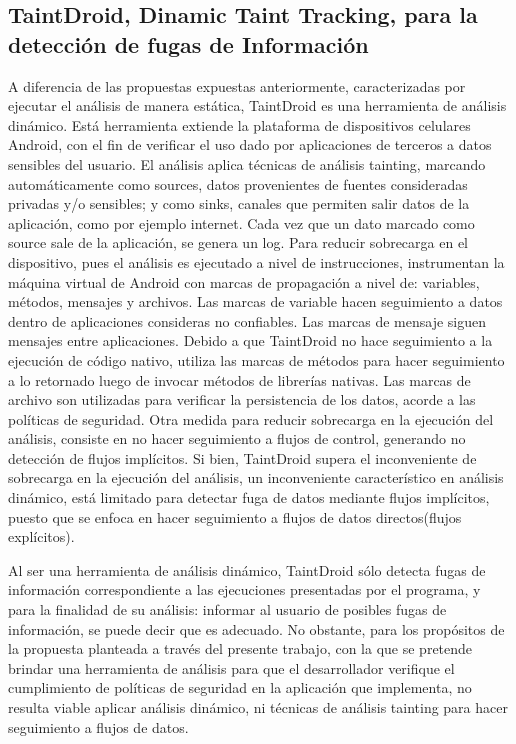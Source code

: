 \subsection{TaintDroid, Dinamic Taint Tracking, para la detección de fugas de
Información}
\label{TaintDroid-Tool}
A diferencia de las propuestas expuestas anteriormente, caracterizadas
por ejecutar el análisis de manera estática, TaintDroid es una herramienta de
análisis dinámico. Está herramienta extiende la plataforma de dispositivos
celulares Android, con el fin de verificar el uso dado por aplicaciones de
terceros a datos sensibles del usuario. El análisis aplica técnicas de análisis
tainting, marcando automáticamente como sources, datos provenientes de fuentes
consideradas privadas y/o sensibles; y como sinks, canales que permiten salir
datos de la aplicación, como por ejemplo internet.
Cada vez que un dato marcado como source sale de la aplicación, se genera un log.\newline 
Para reducir sobrecarga en el dispositivo, pues el análisis es ejecutado a nivel
de instrucciones, instrumentan la máquina virtual de Android con marcas de
propagación a nivel de: variables, métodos, mensajes y archivos. Las marcas de
variable hacen seguimiento a datos dentro de aplicaciones consideras no
confiables. Las marcas de mensaje siguen mensajes entre aplicaciones. Debido a
que TaintDroid no hace seguimiento a la ejecución de código nativo, utiliza las
marcas de métodos para hacer seguimiento a lo retornado luego de invocar métodos
de librerías nativas. Las marcas de archivo son utilizadas para verificar la
persistencia de los datos, acorde a las políticas de seguridad.\newline 
Otra medida para reducir sobrecarga en la ejecución del análisis, consiste en no
hacer seguimiento a flujos de control, generando no detección de flujos
implícitos\cite[pag 12]{TaintDroid}.\newline
Si bien, TaintDroid supera el inconveniente de sobrecarga en la ejecución del
análisis, un inconveniente característico en análisis dinámico, está limitado
para detectar fuga de datos mediante flujos implícitos, puesto que se
enfoca en hacer seguimiento a flujos de datos directos(flujos
explícitos).\newline

Al ser una herramienta de análisis dinámico, TaintDroid sólo detecta fugas de
información correspondiente a las ejecuciones presentadas por el programa, y
para la finalidad de su análisis: informar al usuario de posibles fugas de
información, se puede decir que es adecuado. No obstante, para los propósitos de
la propuesta planteada a través del presente trabajo, con la que se pretende
brindar una herramienta de análisis para que el desarrollador verifique el
cumplimiento de políticas de seguridad en la aplicación que implementa, no
resulta viable aplicar análisis dinámico, ni técnicas de análisis tainting para
hacer seguimiento a flujos de datos.

